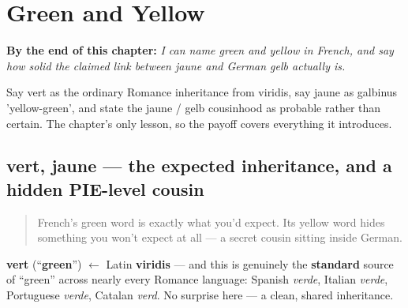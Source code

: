 
\chapter{Green and Yellow}
\label{ch:fr-green-and-yellow}

\begin{chapteropening}
\textbf{By the end of this chapter:} \emph{I can name green and yellow in French, and say how solid the claimed link between jaune and German gelb actually is.}

Say vert as the ordinary Romance inheritance from viridis, say jaune as galbinus 'yellow-green', and state the jaune / gelb cousinhood as probable rather than certain. The chapter's only lesson, so the payoff covers everything it introduces.
\end{chapteropening}

\section[vert, jaune]{vert, jaune — the expected inheritance, and a hidden PIE-level cousin}

\label{lesson:FR-C23-vert-jaune}



\begin{quote}
French's green word is exactly what you'd expect. Its yellow word hides something you won't expect at all — a secret cousin sitting inside German.
\end{quote}

\begin{cousinweb}
\textbf{vert} (\textquotedblleft{}\textbf{green}\textquotedblright{}) $\leftarrow$ Latin \textbf{viridis} — and this is genuinely the \textbf{standard} source of \textquotedblleft{}green\textquotedblright{} across nearly every Romance language: Spanish \emph{verde}, Italian \emph{verde}, Portuguese \emph{verde}, Catalan \emph{verd}. No surprise here — a clean, shared inheritance.
\end{cousinweb}

